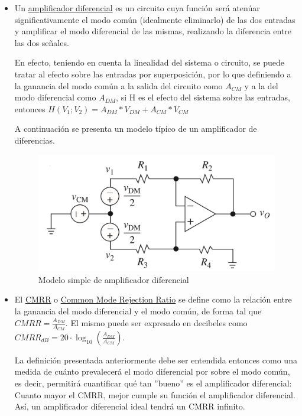 \documentclass[../../tc_tp3_main.tex]{subfiles}
\begin{document}
	\begin{itemize}
	
	\item Un \underline{amplificador diferencial} es un circuito cuya función será atenúar significativamente el modo común (idealmente eliminarlo) de las dos entradas y amplificar el modo diferencial de las mismas, realizando la diferencia entre las dos señales.\par
	En efecto, teniendo en cuenta la linealidad del sistema o circuito, se puede tratar al efecto sobre las entradas por superposición, por lo que definiendo a la ganancia del modo común a la salida del circuito como $A_{CM}$ y a la del modo diferencial como $A_{DM}$, si H es el efecto del sistema sobre las entradas, entonces $H(V_{1};V_{2}) = A_{DM} * V_{DM} + A_{CM} * V_{CM}$\par
	
	A continuación se presenta un modelo típico de un amplificador de diferencias. 
	
	\begin{figure}[H]	
		\centering
		\includegraphics[scale=0.4]{imagenes/amp_diferencial.png}
		\caption{Modelo simple de amplificador diferencial}
		\label{fig:ej5_amp_diferencial}
	\end{figure}

	\item El \underline{CMRR} o \underline{Common Mode Rejection Ratio} se define como la relación entre la ganancia del modo diferencial y el modo común, de forma tal que $CMRR =  \frac{A_{DM}}{A_{CM}}$. El mismo puede ser expresado en decibeles como $CMRR_{dB} =  20 \cdot \log_{10} {(\frac{A_{DM}}{A_{CM}})}$. \par
	La definición presentada anteriormente debe ser entendida entonces como una medida de cuánto prevalecerá el modo diferencial por sobre el modo común, es decir, permitirá cuantificar qué tan ''bueno'' es el amplificador diferencial: Cuanto mayor el CMRR, mejor cumple su función el amplificador diferencial. Así, un amplificador diferencial ideal tendrá un CMRR infinito. \par
	

\end{itemize}
\end{document}
